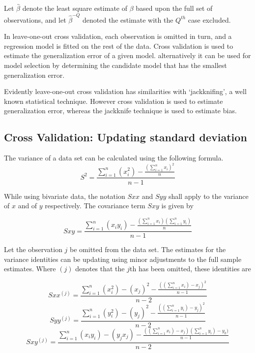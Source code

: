 \documentclass[12pt, a4paper]{report}
\theoremstyle{plain}
\theoremstyle{definition}
\theoremstyle{remark}
\begin{document}
Let $\hat{\beta}$ denote the least square estimate of $\beta$ based upon the full set of observations, and let
$\hat{\beta}^{-Q}$ denoted the estimate with the $Q^{th}$ case
excluded.




In leave-one-out cross validation, each observation is omitted in turn, and a regression model is fitted on the rest of the data. Cross validation is used to estimate the generalization error of a given model. alternatively it can be used for model selection by determining the candidate model that has the smallest generalization error.




Evidently leave-one-out cross validation has similarities with `jackknifing', a well known statistical technique. However cross validation is used to estimate generalization error, whereas the jackknife technique is used to estimate bias.


\subsection{Cross Validation: Updating standard deviation} %


The variance of a data set can be calculated using the following formula.
\begin{equation}
S^{2}=\frac{\sum_{i=1}^{n}(x_{i}^{2})-\frac{(\sum_{i=1}^{n}x_{i})^{2}}{n}}{n-1}
\end{equation}


While using bivariate data, the notation $Sxx$ and $Syy$ shall apply to the variance of $x$ and of $y$ respectively. The covariance term $Sxy$ is given by


\begin{equation}
Sxy=\frac{\sum_{i=1}^{n}(x_{i}y_{i})-\frac{(\sum_{i=1}^{n}x_{i})(\sum_{i=1}^{n}y_{i})}{n}}{n-1}
\end{equation}


Let the observation $j$ be omitted from the data set. The estimates for the variance identities can be updating using minor adjustments to the full sample estimates. Where $(j)$ denotes that the $j$th has been omitted, these identities are


\begin{equation}
Sxx^{(j)}=\frac{\sum_{i=1}^{n}(x_{i}^{2})-(x_{j})^{2}-\frac{((\sum_{i=1}^{n}x_{i})-x_{j})^{2}}{n-1}}{n-2}
\end{equation}
\begin{equation}
Syy^{(j)}=\frac{\sum_{i=1}^{n}(y_{i}^{2})-(y_{j})^{2}-\frac{((\sum_{i=1}^{n}y_{i})-y_{j})^{2}}{n-1}}{n-2}
\end{equation}
\begin{equation}
Sxy^{(j)}=\frac{\sum_{i=1}^{n}(x_{i}y_{i})-(y_{j}x_{j})-\frac{((\sum_{i=1}^{n}x_{i})-x_{j})(\sum_{i=1}^{n}y_{i})-y_{k})}{n-1}}{n-2}
\end{equation}
\end{document}

